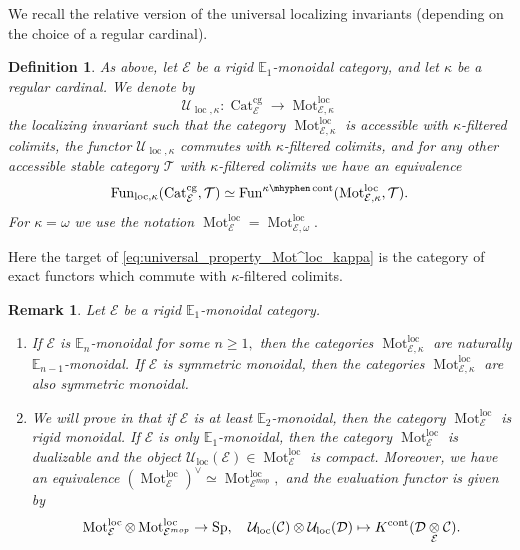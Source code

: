 \documentclass[11pt,leqno]{amsart}
\newtheorem{defi}[theo]{Definition}
\newtheorem{remark}[theo]{Remark}
\numberwithin{equation}{section}
\newcommand{\tens}[1]{%
  \mathbin{\mathop{\otimes}\displaylimits_{#1}}%
}
\newcommand{\hy}{\mhyphen}
\newcommand{\Mot}{\operatorname{Mot}}
\newcommand{\Cat}{\operatorname{Cat}}
\newcommand{\loc}{\operatorname{loc}}
\newcommand{\cont}{\operatorname{cont}}
\newcommand{\cg}{\operatorname{cg}}
\newcommand{\bE}{{\mathbb E}}
\newcommand{\cD}{{\mathcal D}}
\newcommand{\cC}{{\mathcal C}}
\newcommand{\cE}{{\mathcal E}}
\newcommand{\cU}{{\mathcal U}}
\newcommand{\cT}{{\mathcal T}}
\newcommand{\Fun}{\operatorname{Fun}}
\newcommand{\Sp}{\operatorname{Sp}}
\begin{document}
We recall the relative version of the universal localizing invariants (depending on the choice of a regular cardinal).

\begin{defi}
As above, let $\cE$ be a rigid $\bE_1$-monoidal category, and let $\kappa$ be a regular cardinal. We denote by
\begin{equation*}
\cU_{\loc,\kappa}:\Cat_{\cE}^{\cg}\to \Mot^{\loc}_{\cE,\kappa}
\end{equation*}
the localizing invariant such that the category $\Mot^{\loc}_{\cE,\kappa}$ is accessible with $\kappa$-filtered colimits, the functor $\cU_{\loc,\kappa}$ commutes with $\kappa$-filtered colimits, and for any other accessible stable category $\cT$ with $\kappa$-filtered colimits we have an equivalence
\begin{equation}\label{eq:universal_property_Mot^loc_kappa}
\Fun_{\loc,\kappa}(\Cat_{\cE}^{\cg},\cT)\simeq \Fun^{\kappa\hy\cont}(\Mot^{\loc}_{\cE,\kappa},\cT).
\end{equation}
For $\kappa=\omega$ we use the notation $\Mot^{\loc}_{\cE}=\Mot^{\loc}_{\cE,\omega}.$
\end{defi}

Here the target of \eqref{eq:universal_property_Mot^loc_kappa} is the category of exact functors which commute with $\kappa$-filtered colimits.

\begin{remark}
Let $\cE$ be a rigid $\bE_1$-monoidal category.
\begin{enumerate}[label=(\roman*),ref=(\roman*)]
\item If $\cE$ is $\bE_n$-monoidal for some $n\geq 1,$ then the categories $\Mot_{\cE,\kappa}^{\loc}$ are naturally $\bE_{n-1}$-monoidal. If $\cE$ is symmetric monoidal, then the categories  $\Mot_{\cE,\kappa}^{\loc}$ are also symmetric monoidal.
\item We will prove in \cite{E} that if $\cE$ is at least $\bE_2$-monoidal, then the category $\Mot_{\cE}^{\loc}$ is rigid monoidal. If $\cE$ is only $\bE_1$-monoidal, then the category $\Mot^{\loc}_{\cE}$ is dualizable and the object $\cU_{\loc}(\cE)\in \Mot^{\loc}_{\cE}$ is compact. Moreover, we have an equivalence $(\Mot^{\loc}_{\cE})^{\vee}\simeq \Mot^{\loc}_{\cE^{mop}},$ and the evaluation functor is given by
\begin{equation*}
\Mot^{\loc}_{\cE}\otimes \Mot^{\loc}_{\cE^{mop}}\to\Sp,\quad \cU_{\loc}(\cC)\otimes\cU_{\loc}(\cD)\mapsto K^{\cont}(\cD\tens{\cE}\cC).
\end{equation*}
\end{enumerate}
\end{remark} 
\end{document}
